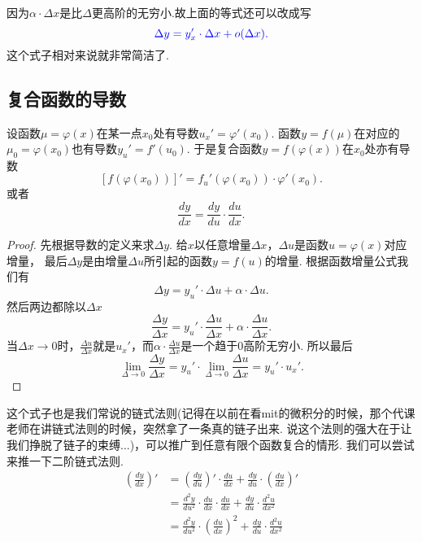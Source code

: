 \documentclass{article}
\begin{document}
因为$\alpha \cdot \Delta x$是比$\Delta$更高阶的无穷小.故上面的等式还可以改成写\[ \color{blue} \Delta y = y_x' \cdot \Delta x + o(\Delta x).\]这个式子相对来说就非常简洁了.
\newpage
\subsection{复合函数的导数}

设函数$ \mu = \varphi(x)$在某一点$x_0$处有导数$u_x' = \varphi'(x_0)$. 函数$y=f(\mu)$在对应的$\mu_0 = \varphi(x_0)$也有导数$y_u'=f'(u_0)$. 于是复合函数$y = f(\varphi(x))$在$x_0$处亦有导数\[[f(\varphi(x_0))]' =  f_u'(\varphi(x_0))\cdot\varphi'(x_0).\]或者\[\frac{dy}{dx} = \frac{dy}{du}\cdot\frac{du}{dx}.\]

\begin{proof}
先根据导数的定义来求$\Delta y $. 给$x$以任意增量$\Delta x$，$\Delta u$是函数$u = \varphi(x)$对应增量， 最后$\Delta y$是由增量$\Delta u$所引起的函数$y = f(u)$的增量. 根据函数增量公式我们有\[\Delta y = y_u' \cdot \Delta u + \alpha \cdot \Delta u.\]然后两边都除以$\Delta x$ \[\frac{\Delta y}{\Delta x} = y_u' \cdot \frac{\Delta u}{\Delta x} + \alpha \cdot \frac{\Delta u}{\Delta x}. \]当$\Delta x \rightarrow 0$时，$\frac{\Delta u}{\Delta x}$就是$u_x'$，而$\alpha \cdot \frac{\Delta u}{\Delta x}$是一个趋于$0$高阶无穷小. 所以最后\[\lim\limits_{\Delta \rightarrow 0} \frac{\Delta y}{\Delta x} = y_u' \cdot \lim\limits_{\Delta \rightarrow 0} \frac{\Delta u}{\Delta x} = y_u' \cdot u_x'. \]
\end{proof}


这个式子也是我们常说的链式法则(记得在以前在看mit的微积分的时候，那个代课老师在讲链式法则的时候，突然拿了一条真的链子出来. 说这个法则的强大在于让我们挣脱了链子的束缚...)，可以推广到任意有限个函数复合的情形. 我们可以尝试来推一下二阶链式法则.
\begin{equation}
\begin{aligned}
\left(\frac{dy}{dx}\right)' &= \left( \frac{dy}{du} \right)' \cdot \frac{du}{dx} + \frac{dy}{du} \cdot \left( \frac{du}{dx} \right)' \\
&= \frac{d^2y}{du^2} \cdot \frac{du}{dx} \cdot \frac{du}{dx} + \frac{dy}{du} \cdot \frac{d^2u}{dx^2} \\
&= \frac{d^2y}{du^2} \cdot \left( \frac{du}{dx} \right) ^2 + \frac{dy}{du} \cdot \frac{d^2u}{dx^2}
\end{aligned}
\end{equation}


\newpage
\end{document}
